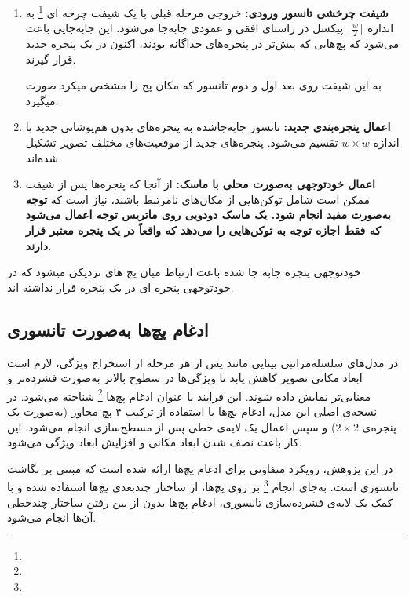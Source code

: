 \begin{enumerate}
	\item \textbf{شیفت چرخشی تانسور ورودی:} خروجی مرحله قبلی  با یک  شیفت چرخه ای 
	\footnote{} به اندازه $\lfloor \frac{w}{2} \rfloor$ پیکسل در راستای افقی و عمودی جابه‌جا می‌شود. این جابه‌جایی باعث می‌شود که پچ‌هایی که پیش‌تر در پنجره‌های جداگانه بودند، اکنون در یک پنجره جدید قرار گیرند.
	
	به این شیفت روی بعد اول و دوم تانسور که مکان پج را مشخص میکرد صورت میگیرد.
	
	\item \textbf{اعمال پنجره‌بندی جدید:} تانسور جابه‌جا‌شده به پنجره‌های بدون هم‌پوشانی جدید با اندازه $w \times w$ تقسیم می‌شود. پنجره‌های جدید از موقعیت‌های مختلف تصویر تشکیل شده‌اند.
	
	\item \textbf{اعمال خودتوجهی به‌صورت محلی با ماسک:} از آنجا که پنجره‌ها پس از شیفت ممکن است شامل توکن‌هایی از مکان‌های نامرتبط باشند، نیاز است که \textbf{توجه به‌صورت مفید  انجام شود. یک ماسک دودویی روی ماتریس توجه اعمال می‌شود که فقط اجازه توجه به توکن‌هایی را می‌دهد که واقعاً در یک پنجره معتبر قرار دارند.}
	
\end{enumerate}



خودتوجهی پنجره جابه جا شده باعث ارتباط میان پج های نزدیکی میشود که در خودتوجهی پنجره ای در یک پنجره قرار نداشته اند. 



\subsection{ادغام پچ‌ها به‌صورت تانسوری}

در مدل‌های سلسله‌مراتبی بینایی مانند پس از هر مرحله از استخراج ویژگی، لازم است ابعاد مکانی تصویر کاهش یابد تا ویژگی‌ها در سطوح بالاتر به‌صورت فشرده‌تر و معنایی‌تر نمایش داده شوند. این فرایند با عنوان ادغام پچ‌ها \footnote{} شناخته می‌شود. در نسخه‌ی اصلی این مدل، ادغام پچ‌ها با استفاده از ترکیب ۴ پچ مجاور (به‌صورت یک پنجره‌ی $2 \times 2$) و سپس اعمال یک لایه‌ی خطی پس از مسطح‌سازی انجام می‌شود. این کار باعث نصف شدن ابعاد مکانی و افزایش ابعاد ویژگی می‌شود.

در این پژوهش، رویکرد متفاوتی برای ادغام پچ‌ها ارائه شده است که مبتنی بر نگاشت تانسوری است. به‌جای انجام \footnote{} بر روی پچ‌ها، از ساختار چندبعدی پچ‌ها استفاده شده و با کمک یک لایه‌ی فشرده‌سازی تانسوری، ادغام پچ‌ها بدون از بین رفتن ساختار چندخطی آن‌ها انجام می‌شود.

